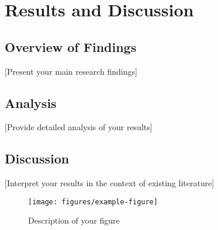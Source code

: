 \chapter{Results and Discussion}

\section{Overview of Findings}
[Present your main research findings]

\section{Analysis}
[Provide detailed analysis of your results]

\section{Discussion}
[Interpret your results in the context of existing literature]

\begin{figure}[htbp]
    \centering
    \texttt{[image: figures/example-figure]}
    \caption{Description of your figure}
    \label{fig:example}
\end{figure} 